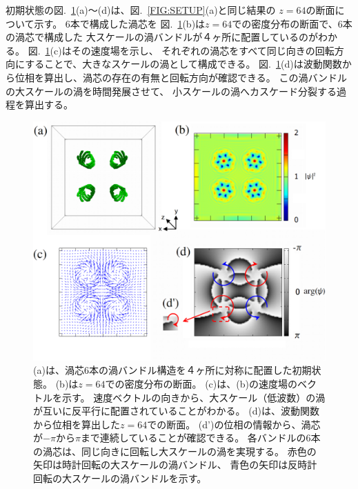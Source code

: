 \documentclass[12pt,a4paper]{jbook}
\begin{document}
            初期状態の図.~\ref{FIG:vbndl}(a)～(d)は、図.~\ref{FIG:SETUP}(a)と同じ結果の
            $z=64$の断面について示す。
            $6$本で構成した渦芯を
			図.~\ref{FIG:vbndl}(b)は$z=64$での密度分布の断面で、$6$本の渦芯で構成した
            大スケールの渦バンドルが４ヶ所に配置しているのがわかる。
			図.~\ref{FIG:vbndl}(c)はその速度場を示し、
            それぞれの渦芯をすべて同じ向きの回転方向にすることで、大きなスケールの渦として構成できる。
            図.~\ref{FIG:vbndl}(d)は波動関数から位相を算出し、渦芯の存在の有無と回転方向が確認できる。
			この渦バンドルの大スケールの渦を時間発展させて、
            小スケールの渦へカスケード分裂する過程を算出する。
			\begin{figure}[H]
				\centering
				\includegraphics[width=16cm]{vbundle.eps}
				\caption{
					(a)は、渦芯$6$本の渦バンドル構造を４ヶ所に対称に配置した初期状態。
					(b)は$z=64$での密度分布の断面。
					(c)は、(b)の速度場のベクトルを示す。
                    速度ベクトルの向きから、大スケール（低波数）の渦が互いに反平行に配置されていることがわかる。
                    (d)は、波動関数から位相を算出した$z=64$での断面。
                    (d')の位相の情報から、渦芯が$-\pi$から$\pi$まで連続していることが確認できる。
                    各バンドルの$6$本の渦芯は、同じ向きに回転し大スケールの渦を実現する。
                    赤色の矢印は時計回転の大スケールの渦バンドル、
                    青色の矢印は反時計回転の大スケールの渦バンドルを示す。
				}
				\label{FIG:vbndl}
			\end{figure}
\end{document}
